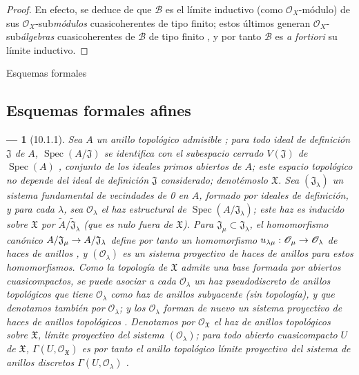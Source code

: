 \documentclass[oneside]{amsart}
\makeatletter
\theoremstyle{ega-env-style}
\newtheorem*{env}{---}
\theoremstyle{ega-thm-env-style}
\theoremstyle{ega-defn-env-style}
\def\section{\@startsection{section}{1}%
  \z@{.7\linespacing\@plus\linespacing}{.5\linespacing}%
  {\normalfont\bfseries\Large\scshape\centering}}
\renewcommand{\to}{\mathchoice{\longrightarrow}{\rightarrow}{\rightarrow}{\rightarrow}}
\newcommand{\oldpage}[2][]{{\marginnote{\normalfont{\textbf{#1}~|~#2}}}\ignorespaces}
\let\EGAOriginalLabel\label
\renewcommand{\label}[1]{\phantomsection\EGAOriginalLabel{#1}}
\makeatother
\begin{document}
\begin{proof}
En efecto, se deduce de  que $\mathscr{B}$ es el límite inductivo (como $\mathscr{O}_X$-módulo) de sus $\mathscr{O}_X$-sub\emph{módulos} cuasicoherentes de tipo finito; estos últimos generan $\mathscr{O}_X$-sub\emph{álgebras} cuasicoherentes de $\mathscr{B}$ de tipo finito , y por tanto $\mathscr{B}$ es \emph{a fortiori} su límite inductivo.
\end{proof}

\section{Esquemas formales}
\label{section:I.10}

\subsection{Esquemas formales afines}
\label{subsection:I.10.1}

\begin{env}[10.1.1]
\label{I.10.1.1}
Sea $A$ un anillo topológico \emph{admisible} ; para todo ideal de definición $\mathfrak{J}$ de $A$, $\operatorname{Spec}(A/\mathfrak{J})$ se identifica con el subespacio cerrado $V(\mathfrak{J})$ de $\operatorname{Spec}(A)$ , conjunto de los ideales primos \emph{abiertos} de $A$; este espacio topológico no depende
\oldpage[I]{181}
del ideal de definición $\mathfrak{J}$ considerado; denotémoslo $\mathfrak{X}$. Sea $(\mathfrak{J}_\lambda)$ un sistema fundamental de vecindades de 0 en $A$, formado por ideales de definición, y para cada $\lambda$, sea $\mathscr{O}_\lambda$ el haz estructural de $\operatorname{Spec}(A/\mathfrak{J}_\lambda)$; este haz es inducido sobre $\mathfrak{X}$ por $\widetilde{A}/\widetilde{\mathfrak{J}}_\lambda$ (que es nulo fuera de $\mathfrak{X}$).
Para $\mathfrak{J}_\mu\subset\mathfrak{J}_\lambda$, el homomorfismo canónico $A/\mathfrak{J}_\mu\to A/\mathfrak{J}_\lambda$ define por tanto un homomorfismo $u_{\lambda\mu}:\mathscr{O}_\mu\to\mathscr{O}_\lambda$ de haces de anillos , y $(\mathscr{O}_\lambda)$ es un \emph{sistema proyectivo de haces de anillos} para estos homomorfismos.
Como la topología de $\mathfrak{X}$ admite una base formada por abiertos cuasicompactos, se puede asociar a cada $\mathscr{O}_\lambda$ un \emph{haz pseudodiscreto de anillos topológicos}  que tiene $\mathscr{O}_\lambda$ como haz de anillos subyacente (sin topología), y que denotamos también por $\mathscr{O}_\lambda$; y los $\mathscr{O}_\lambda$ forman de nuevo un \emph{sistema proyectivo de haces de anillos topológicos} .
Denotamos por $\mathscr{O}_{\mathfrak{X}}$ el \emph{haz de anillos topológicos} sobre $\mathfrak{X}$, límite proyectivo del sistema $(\mathscr{O}_\lambda)$; para todo abierto \emph{cuasicompacto} $U$ de $\mathfrak{X}$, $\Gamma(U,\mathscr{O}_{\mathfrak{X}})$ es por tanto el anillo topológico límite proyectivo del sistema de anillos \emph{discretos} $\Gamma(U,\mathscr{O}_\lambda)$ .
\end{env}
\end{document}
